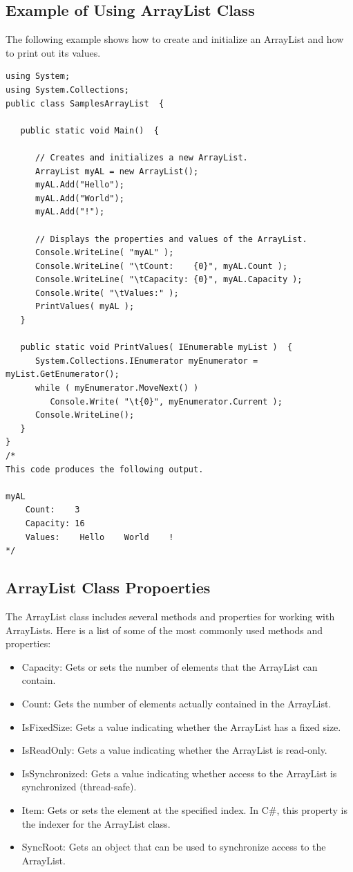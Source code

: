 \documentclass[12pt,a4paper,final,twoside,titlepage]{book}
\begin{document}
\subsection{Example of Using ArrayList Class}
The following example shows how to create and initialize an ArrayList and how to print out its values.
\begin{lstlisting}
using System;
using System.Collections;
public class SamplesArrayList  {

   public static void Main()  {

      // Creates and initializes a new ArrayList.
      ArrayList myAL = new ArrayList();
      myAL.Add("Hello");
      myAL.Add("World");
      myAL.Add("!");

      // Displays the properties and values of the ArrayList.
      Console.WriteLine( "myAL" );
      Console.WriteLine( "\tCount:    {0}", myAL.Count );
      Console.WriteLine( "\tCapacity: {0}", myAL.Capacity );
      Console.Write( "\tValues:" );
      PrintValues( myAL );
   }

   public static void PrintValues( IEnumerable myList )  {
      System.Collections.IEnumerator myEnumerator = myList.GetEnumerator();
      while ( myEnumerator.MoveNext() )
         Console.Write( "\t{0}", myEnumerator.Current );
      Console.WriteLine();
   }
}
/* 
This code produces the following output.

myAL
    Count:    3
    Capacity: 16
    Values:    Hello    World    !
*/
\end{lstlisting}
\subsection{ArrayList Class Propoerties}
The ArrayList class includes several methods and properties for working with ArrayLists. Here is a list of some of the most commonly used methods and properties:
\begin{itemize}
\item Capacity: Gets or sets the number of elements that the ArrayList can contain.
\item Count: Gets the number of elements actually contained in the ArrayList.
\item IsFixedSize: Gets a value indicating whether the ArrayList has a fixed size.
\item IsReadOnly: Gets a value indicating whether the ArrayList is read-only.
\item IsSynchronized: Gets a value indicating whether access to the ArrayList is synchronized (thread-safe).
\item Item: Gets or sets the element at the specified index. In C\#, this property is the indexer for the ArrayList class.
\item SyncRoot: Gets an object that can be used to synchronize access to the ArrayList.
\end{itemize}
\end{document}
